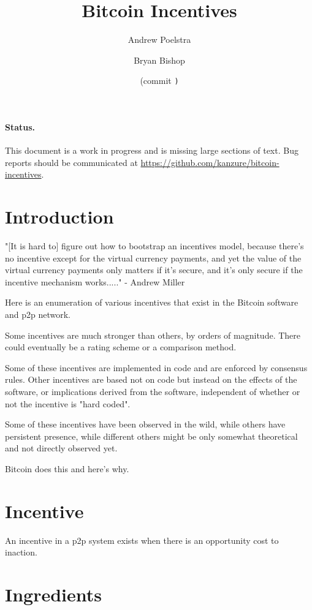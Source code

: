 \documentclass[letterpaper]{article}
\title{Bitcoin Incentives}
\author{Andrew Poelstra}
\author{Bryan Bishop}
\date{\gitAuthorDate{} (commit \texttt{\gitAbbrevHash)}}
\begin{document}
\maketitle

\paragraph{Status.} This document is a work in progress and is missing large
sections of text. Bug reports should be communicated at
\url{https://github.com/kanzure/bitcoin-incentives}.

\section{Introduction}

"[It is hard to] figure out how to bootstrap an incentives model, because
there's no incentive except for the virtual currency payments, and yet the
value of the virtual currency payments only matters if it's secure, and it's
only secure if the incentive mechanism works....." - Andrew Miller

Here is an enumeration of various incentives that exist in the Bitcoin software
and p2p network.

Some incentives are much stronger than others, by orders of magnitude. There
could eventually be a rating scheme or a comparison method.

Some of these incentives are implemented in code and are enforced by consensus
rules. Other incentives are based not on code but instead on the effects of the
software, or implications derived from the software, independent of whether or
not the incentive is "hard coded".

Some of these incentives have been observed in the wild, while others have
persistent presence, while different others might be only somewhat theoretical
and not directly observed yet.

Bitcoin does this and here's why.

\section{Incentive}

An incentive in a p2p system exists when there is an opportunity cost to
inaction.

\section{Ingredients}
\end{document}
